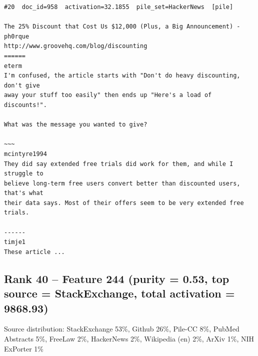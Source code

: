 \begin{verbatim}
#20  doc_id=958  activation=32.1855  pile_set=HackerNews  [pile]

The 25% Discount that Cost Us $12,000 (Plus, a Big Announcement) - ph0rque
http://www.groovehq.com/blog/discounting
======
eterm
I'm confused, the article starts with "Don't do heavy discounting, don't give
away your stuff too easily" then ends up "Here's a load of discounts!".

What was the message you wanted to give?

~~~
mcintyre1994
They did say extended free trials did work for them, and while I struggle to
believe long-term free users convert better than discounted users, that's what
their data says. Most of their offers seem to be very extended free trials.

------
timje1
These article ...

\end{verbatim}

\subsection*{Rank 40 -- Feature 244 (purity = 0.53, top source = StackExchange, total activation = 9868.93)}

Source distribution: StackExchange 53\%, Github 26\%, Pile-CC 8\%, PubMed Abstracts 5\%, FreeLaw 2\%, HackerNews 2\%, Wikipedia (en) 2\%, ArXiv 1\%, NIH ExPorter 1\%

